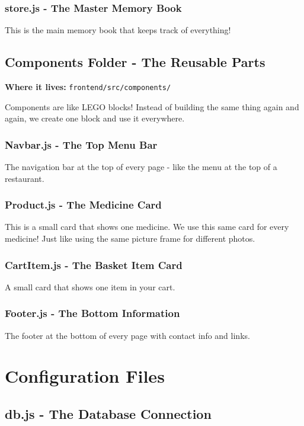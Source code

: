 \documentclass[12pt]{article}
\begin{document}
\subsubsection{store.js - The Master Memory Book}
This is the main memory book that keeps track of everything!

\subsection{Components Folder - The Reusable Parts}

\textbf{Where it lives:} \texttt{frontend/src/components/}

Components are like LEGO blocks! Instead of building the same thing again and again, we create one block and use it everywhere.

\subsubsection{Navbar.js - The Top Menu Bar}
The navigation bar at the top of every page - like the menu at the top of a restaurant.

\subsubsection{Product.js - The Medicine Card}
This is a small card that shows one medicine. We use this same card for every medicine! Just like using the same picture frame for different photos.

\subsubsection{CartItem.js - The Basket Item Card}
A small card that shows one item in your cart.

\subsubsection{Footer.js - The Bottom Information}
The footer at the bottom of every page with contact info and links.

\section{Configuration Files}

\subsection{db.js - The Database Connection}
\end{document}
